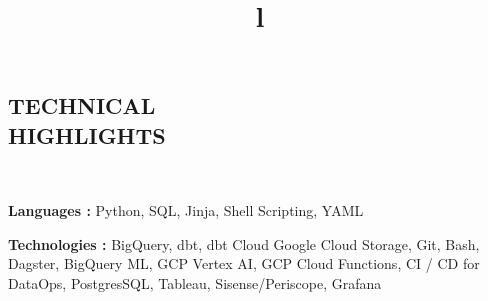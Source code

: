 \documentclass[margin]{res}
\begin{document}
\begin{resume}

\section{TECHNICAL\\HIGHLIGHTS}\

\textbf{Languages :} Python, SQL, Jinja, Shell Scripting, YAML

\textbf{Technologies :} BigQuery, dbt, dbt Cloud Google Cloud Storage, Git, Bash, Dagster, BigQuery ML, GCP Vertex AI, GCP Cloud Functions, CI / CD for DataOps, PostgresSQL, Tableau, Sisense/Periscope, Grafana

\\
\begin{format}
\title{l}\\
\\
\body\\
\end{format}






\end{resume}
\end{document}
